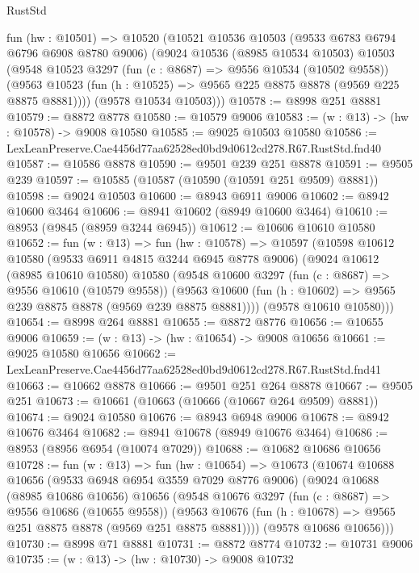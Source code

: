 \begin{lexlean}{RustStd}
\begin{coremodule}
  fun (hw : @10501) =>
  @10520
    (@10521
      @10536
      @10503
      (@9533 @6783 @6794 @6796 @6908 @8780 @9006)
      (@9024
        @10536
        (@8985 @10534 @10503)
        @10503
        (@9548
          @10523
          @3297
          (fun (c : @8687) => @9556 @10534 (@10502 @9558))
          (@9563 @10523 (fun (h : @10525) => @9565 @225 @8875 @8878 (@9569 @225 @8875 @8881))))
        (@9578 @10534 @10503)))
@10578 := @8998 @251 @8881
@10579 := @8872 @8778
@10580 := @10579 @9006
@10583 := (w : @13) -> (hw : @10578) -> @9008 @10580
@10585 := @9025 @10503 @10580
@10586 := LexLeanPreserve.Cae4456d77aa62528ed0bd9d0612cd278.R67.RustStd.fnd40
@10587 := @10586 @8878
@10590 := @9501 @239 @251 @8878
@10591 := @9505 @239
@10597 := @10585 (@10587 (@10590 (@10591 @251 @9509) @8881))
@10598 := @9024 @10503
@10600 := @8943 @6911 @9006
@10602 := @8942 @10600 @3464
@10606 := @8941 @10602 (@8949 @10600 @3464)
@10610 := @8953 (@9845 (@8959 @3244 @6945))
@10612 := @10606 @10610 @10580
@10652 := fun (w : @13) =>
  fun (hw : @10578) =>
  @10597
    (@10598
      @10612
      @10580
      (@9533 @6911 @4815 @3244 @6945 @8778 @9006)
      (@9024
        @10612
        (@8985 @10610 @10580)
        @10580
        (@9548
          @10600
          @3297
          (fun (c : @8687) => @9556 @10610 (@10579 @9558))
          (@9563 @10600 (fun (h : @10602) => @9565 @239 @8875 @8878 (@9569 @239 @8875 @8881))))
        (@9578 @10610 @10580)))
@10654 := @8998 @264 @8881
@10655 := @8872 @8776
@10656 := @10655 @9006
@10659 := (w : @13) -> (hw : @10654) -> @9008 @10656
@10661 := @9025 @10580 @10656
@10662 := LexLeanPreserve.Cae4456d77aa62528ed0bd9d0612cd278.R67.RustStd.fnd41
@10663 := @10662 @8878
@10666 := @9501 @251 @264 @8878
@10667 := @9505 @251
@10673 := @10661 (@10663 (@10666 (@10667 @264 @9509) @8881))
@10674 := @9024 @10580
@10676 := @8943 @6948 @9006
@10678 := @8942 @10676 @3464
@10682 := @8941 @10678 (@8949 @10676 @3464)
@10686 := @8953 (@8956 @6954 (@10074 @7029))
@10688 := @10682 @10686 @10656
@10728 := fun (w : @13) =>
  fun (hw : @10654) =>
  @10673
    (@10674
      @10688
      @10656
      (@9533 @6948 @6954 @3559 @7029 @8776 @9006)
      (@9024
        @10688
        (@8985 @10686 @10656)
        @10656
        (@9548
          @10676
          @3297
          (fun (c : @8687) => @9556 @10686 (@10655 @9558))
          (@9563 @10676 (fun (h : @10678) => @9565 @251 @8875 @8878 (@9569 @251 @8875 @8881))))
        (@9578 @10686 @10656)))
@10730 := @8998 @71 @8881
@10731 := @8872 @8774
@10732 := @10731 @9006
@10735 := (w : @13) -> (hw : @10730) -> @9008 @10732

\end{coremodule}
\end{lexlean}
